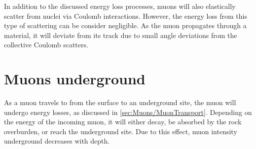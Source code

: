 In addition to the discussed energy loss processes, muons will also elastically scatter from nuclei via Coulomb interactions. However, the energy loss from this type of scattering can be consider negligible. As the muon propagates through a material, it will deviate from its track due to small angle deviations from the collective Coulomb scatters. 

\section{Muons underground}\label{sec:Muons/MuonsUnderground}
As a muon travels to from the surface to an underground site, the muon will undergo energy losses, as discussed in \autoref{sec:Muons/MuonTransport}. Depending on the energy of the incoming muon, it will either decay, be absorbed by the rock overburden, or reach the underground site. Due to this effect, muon intensity underground decreases with depth.

